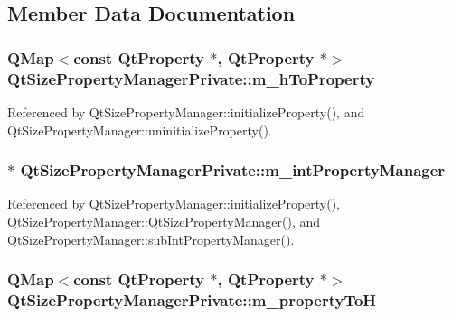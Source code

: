 \subsection{Member Data Documentation}
\subsubsection[{m\+\_\+h\+To\+Property}]{\setlength{\rightskip}{0pt plus 5cm}Q\+Map$<$const {\bf Qt\+Property} $\ast$, {\bf Qt\+Property} $\ast$$>$ Qt\+Size\+Property\+Manager\+Private\+::m\+\_\+h\+To\+Property}\label{classQtSizePropertyManagerPrivate_ade58bdd517687b6b6eda954ddb6d8ab6}


Referenced by Qt\+Size\+Property\+Manager\+::initialize\+Property(), and Qt\+Size\+Property\+Manager\+::uninitialize\+Property().

\subsubsection[{m\+\_\+int\+Property\+Manager}]{$\ast$ Qt\+Size\+Property\+Manager\+Private\+::m\+\_\+int\+Property\+Manager}\label{classQtSizePropertyManagerPrivate_ab6085d4a72ff7e0b01dc10b5f74b0cc1}


Referenced by Qt\+Size\+Property\+Manager\+::initialize\+Property(), Qt\+Size\+Property\+Manager\+::\+Qt\+Size\+Property\+Manager(), and Qt\+Size\+Property\+Manager\+::sub\+Int\+Property\+Manager().

\subsubsection[{m\+\_\+property\+ToH}]{\setlength{\rightskip}{0pt plus 5cm}Q\+Map$<$const {\bf Qt\+Property} $\ast$, {\bf Qt\+Property} $\ast$$>$ Qt\+Size\+Property\+Manager\+Private\+::m\+\_\+property\+ToH}\label{classQtSizePropertyManagerPrivate_a8c414f6e39b1d7d663b911180567216f}


